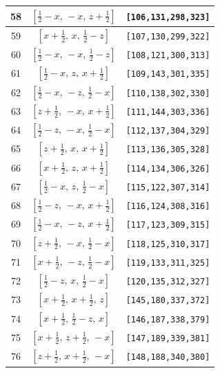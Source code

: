 \documentclass[fleqn,8pt]{jsarticle}
\begin{document}
\begin{longtable}{ccc}
58 & $\left[ \frac{1}{2} - x,\, - x,\, z + \frac{1}{2} \right]$ & {\tt [106,131,298,323]} \\ \hline
59 & $\left[ x + \frac{1}{2},\, x,\, \frac{1}{2} - z \right]$ & {\tt [107,130,299,322]} \\ \hline
60 & $\left[ \frac{1}{2} - x,\, - x,\, \frac{1}{2} - z \right]$ & {\tt [108,121,300,313]} \\ \hline
61 & $\left[ \frac{1}{2} - x,\, z,\, x + \frac{1}{2} \right]$ & {\tt [109,143,301,335]} \\ \hline
62 & $\left[ \frac{1}{2} - x,\, - z,\, \frac{1}{2} - x \right]$ & {\tt [110,138,302,330]} \\ \hline
63 & $\left[ z + \frac{1}{2},\, - x,\, x + \frac{1}{2} \right]$ & {\tt [111,144,303,336]} \\ \hline
64 & $\left[ \frac{1}{2} - z,\, - x,\, \frac{1}{2} - x \right]$ & {\tt [112,137,304,329]} \\ \hline
65 & $\left[ z + \frac{1}{2},\, x,\, x + \frac{1}{2} \right]$ & {\tt [113,136,305,328]} \\ \hline
66 & $\left[ x + \frac{1}{2},\, z,\, x + \frac{1}{2} \right]$ & {\tt [114,134,306,326]} \\ \hline
67 & $\left[ \frac{1}{2} - x,\, z,\, \frac{1}{2} - x \right]$ & {\tt [115,122,307,314]} \\ \hline
68 & $\left[ \frac{1}{2} - z,\, - x,\, x + \frac{1}{2} \right]$ & {\tt [116,124,308,316]} \\ \hline
69 & $\left[ \frac{1}{2} - x,\, - z,\, x + \frac{1}{2} \right]$ & {\tt [117,123,309,315]} \\ \hline
70 & $\left[ z + \frac{1}{2},\, - x,\, \frac{1}{2} - x \right]$ & {\tt [118,125,310,317]} \\ \hline
71 & $\left[ x + \frac{1}{2},\, - z,\, \frac{1}{2} - x \right]$ & {\tt [119,133,311,325]} \\ \hline
72 & $\left[ \frac{1}{2} - z,\, x,\, \frac{1}{2} - x \right]$ & {\tt [120,135,312,327]} \\ \hline
73 & $\left[ x + \frac{1}{2},\, x + \frac{1}{2},\, z \right]$ & {\tt [145,180,337,372]} \\ \hline
74 & $\left[ x + \frac{1}{2},\, \frac{1}{2} - z,\, x \right]$ & {\tt [146,187,338,379]} \\ \hline
75 & $\left[ x + \frac{1}{2},\, z + \frac{1}{2},\, - x \right]$ & {\tt [147,189,339,381]} \\ \hline
76 & $\left[ z + \frac{1}{2},\, x + \frac{1}{2},\, - x \right]$ & {\tt [148,188,340,380]} \\ \hline

\end{longtable}
\end{document}
